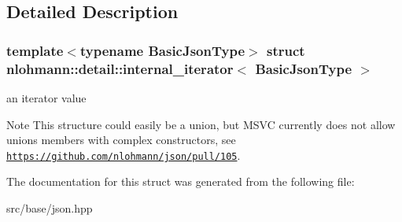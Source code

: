 \subsection{Detailed Description}
\subsubsection*{template$<$typename Basic\+Json\+Type$>$\newline
struct nlohmann\+::detail\+::internal\+\_\+iterator$<$ Basic\+Json\+Type $>$}

an iterator value 

\begin{DoxyNote}{Note}
This structure could easily be a union, but M\+S\+VC currently does not allow unions members with complex constructors, see \href{https://github.com/nlohmann/json/pull/105}{\tt https\+://github.\+com/nlohmann/json/pull/105}. 
\end{DoxyNote}


The documentation for this struct was generated from the following file\+:\begin{DoxyCompactItemize}
\item 
src/base/json.\+hpp\end{DoxyCompactItemize}

